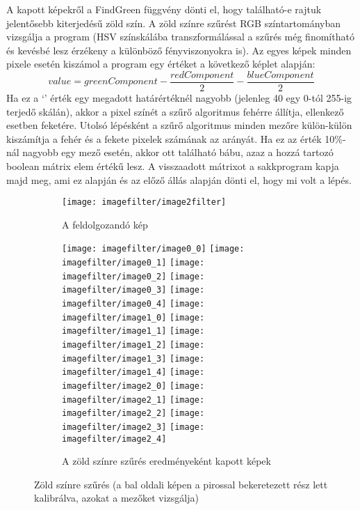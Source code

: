 \documentclass[../documentation.tex]{subfiles}
\begin{document}
A kapott képekről a FindGreen függvény dönti el, hogy található-e rajtuk jelentősebb kiterjedésű zöld szín. A zöld színre szűrést RGB színtartományban vizsgálja a program (HSV színskálába transzformálással a szűrés még finomítható és kevésbé lesz érzékeny a különböző fényviszonyokra is). Az egyes képek minden pixele esetén kiszámol a program egy értéket a következő képlet alapján:
\[value = greenComponent - \dfrac{redComponent}{2}  - \dfrac{blueComponent}{2}\]
Ha ez a `' érték egy megadott határértéknél nagyobb (jelenleg 40 egy 0-tól 255-ig terjedő skálán), akkor a pixel színét a szűrő algoritmus fehérre állítja, ellenkező esetben feketére. Utolsó lépésként a szűrő algoritmus minden mezőre külön-külön kiszámítja a fehér és a fekete pixelek számának az arányát. Ha ez az érték 10\%-nál nagyobb egy mező esetén, akkor ott található bábu, azaz a hozzá tartozó boolean mátrix elem  értékű lesz. A visszaadott mátrixot a sakkprogram kapja majd meg, ami ez alapján és az előző állás alapján dönti el, hogy mi volt a lépés.

\begin{figure}
	\begin{subfigure}{.5\textwidth}
		\texttt{[image: imagefilter/image2filter]}
		\caption{A feldolgozandó kép}
	\end{subfigure}
	\begin{subfigure}{.5\textwidth}
		\centering
		\texttt{[image: imagefilter/image0\_0]}
		\texttt{[image: imagefilter/image0\_1]}
		\texttt{[image: imagefilter/image0\_2]}
		\texttt{[image: imagefilter/image0\_3]}
		\texttt{[image: imagefilter/image0\_4]}
		\texttt{[image: imagefilter/image1\_0]}
		\texttt{[image: imagefilter/image1\_1]}
		\texttt{[image: imagefilter/image1\_2]}
		\texttt{[image: imagefilter/image1\_3]}
		\texttt{[image: imagefilter/image1\_4]}
		\texttt{[image: imagefilter/image2\_0]}
		\texttt{[image: imagefilter/image2\_1]}
		\texttt{[image: imagefilter/image2\_2]}
		\texttt{[image: imagefilter/image2\_3]}
		\texttt{[image: imagefilter/image2\_4]}
		\caption{A zöld színre szűrés eredményeként kapott képek}
	\end{subfigure}
\caption{Zöld színre szűrés (a bal oldali képen a pirossal bekeretezett rész lett kalibrálva, azokat a mezőket vizsgálja)}
\label{fig:colorfiltering}
\end{figure}
\end{document}
